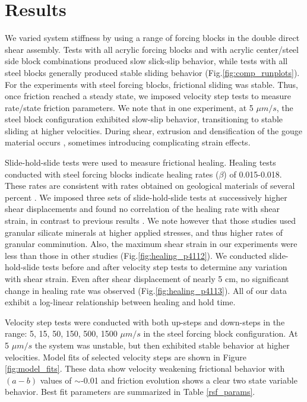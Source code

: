 \section{Results}

We varied system stiffness by using a range of forcing blocks in the double
direct shear assembly. Tests with all acrylic forcing blocks and with acrylic
center/steel side block combinations produced slow slick-slip behavior, while
tests with all steel blocks generally produced stable sliding behavior
(Fig.\ref{fig:comp_runplots}). For the experiments with steel forcing blocks,
frictional sliding was stable. Thus, once friction reached a steady state, we
imposed velocity step tests to measure rate/state friction parameters.  We note
that in one experiment, at 5 $\mu m/s$, the steel block configuration exhibited
slow-slip behavior, transitioning to stable sliding at higher velocities. During
shear, extrusion and densification of the gouge material occurs
\cite{scott1994apparent}, sometimes introducing complicating strain effects.

Slide-hold-slide tests were used to measure frictional healing. Healing tests
conducted with steel forcing blocks indicate healing rates ($\beta$) of
0.015-0.018.  These rates are consistent with rates obtained on geological
materials of several percent
\cite{dieterich1978time,dieterich1972time,Marone_1998,karner1997laboratory,beeler1994roles}.
We imposed three sets of slide-hold-slide tests at successively higher shear
displacements and found no correlation of the healing rate with shear strain, in
contrast to previous results \cite{Richardson_1999}.  We note however that those
studies used granular silicate minerals at higher applied stresses, and thus
higher rates of granular comminution.  Also, the maximum shear strain in our
experiments were less than those in other studies (Fig.\ref{fig:healing_p4112}).
We conducted slide-hold-slide tests before and after velocity step tests to
determine any variation with shear strain. Even after shear displacement of
nearly 5 cm, no significant change in healing rate was observed
(Fig.\ref{fig:healing_p4113}). All of our data exhibit a log-linear relationship
between healing and hold time.

Velocity step tests were conducted with both up-steps and down-steps in the
range: 5, 15, 50, 150, 500, 1500 $\mu m/s$ in the steel forcing block
configuration.  At 5  $\mu m/s$ the system was unstable, but then exhibited
stable behavior at higher velocities.  Model fits of selected velocity steps are
shown in Figure \ref{fig:model_fits}.  These data show velocity weakening
frictional behavior with $(a-b)$ values of $\sim$-0.01 and friction evolution
shows a clear two state variable behavior.  Best fit parameters are summarized
in Table \ref{rsf_params}.

